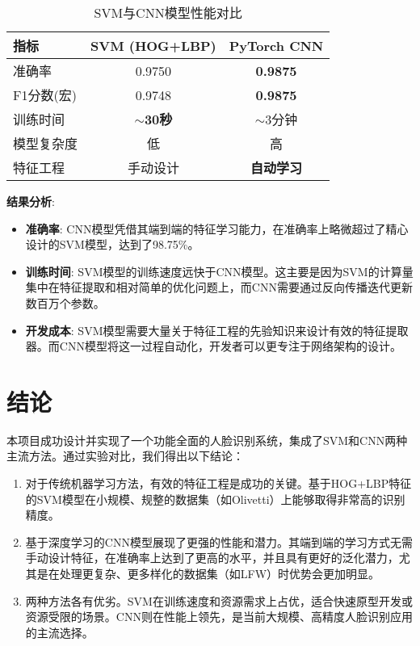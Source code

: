 \documentclass[a4paper]{article}
\begin{document}
\begin{table}[H]
    \centering
    \caption{SVM与CNN模型性能对比}
    \label{tab:model_comparison}
    \begin{tabular}{@{}lcc@{}}
        \toprule
        指标 & SVM (HOG+LBP) & PyTorch CNN \\
        \midrule
        准确率 & 0.9750 & \textbf{0.9875} \\
        F1分数(宏) & 0.9748 & \textbf{0.9875} \\
        训练时间 & \textbf{$\sim$30秒} & $\sim$3分钟 \\
        模型复杂度 & 低 & 高 \\
        特征工程 & 手动设计 & \textbf{自动学习} \\
        \bottomrule
    \end{tabular}
\end{table}

\textbf{结果分析}:
\begin{itemize}
    \item \textbf{准确率}: CNN模型凭借其端到端的特征学习能力，在准确率上略微超过了精心设计的SVM模型，达到了98.75\%。
    \item \textbf{训练时间}: SVM模型的训练速度远快于CNN模型。这主要是因为SVM的计算量集中在特征提取和相对简单的优化问题上，而CNN需要通过反向传播迭代更新数百万个参数。
    \item \textbf{开发成本}: SVM模型需要大量关于特征工程的先验知识来设计有效的特征提取器。而CNN模型将这一过程自动化，开发者可以更专注于网络架构的设计。
\end{itemize}

\section{结论}
本项目成功设计并实现了一个功能全面的人脸识别系统，集成了SVM和CNN两种主流方法。通过实验对比，我们得出以下结论：
\begin{enumerate}
    \item 对于传统机器学习方法，有效的特征工程是成功的关键。基于HOG+LBP特征的SVM模型在小规模、规整的数据集（如Olivetti）上能够取得非常高的识别精度。
    \item 基于深度学习的CNN模型展现了更强的性能和潜力。其端到端的学习方式无需手动设计特征，在准确率上达到了更高的水平，并且具有更好的泛化潜力，尤其是在处理更复杂、更多样化的数据集（如LFW）时优势会更加明显。
    \item 两种方法各有优劣。SVM在训练速度和资源需求上占优，适合快速原型开发或资源受限的场景。CNN则在性能上领先，是当前大规模、高精度人脸识别应用的主流选择。
\end{enumerate}
\end{document}
